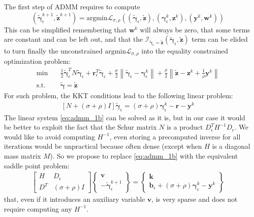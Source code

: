 \documentclass{svproc}
\newcommand{\vect}[1]{\bm{#1}}
\newcommand{\norm}[1]{\left\lVert#1\right\rVert}
\begin{document}
The first step of ADMM requires to compute 
\[
(\tilde{\vect{\gamma}}_\epsilon^{k+1},\tilde{\vect{z}}^{k+1}) = \text{argmin} \mathcal{L}_{\sigma,\rho} \left((\tilde{\vect{\gamma}}_\epsilon,\tilde{\vect{z}}),(\vect{\gamma}_\epsilon^k,\vect{z}^k),(\vect{y}^k,\vect{w}^k)\right)
\] 
This can be simplified remembering that $\vect{w}^k$ will always be zero, that some terms are constant and can be left out, and that the $\mathcal{I}_{\tilde{\vect{\gamma}}_\epsilon = \tilde{\vect{z}}}(\tilde{\vect{\gamma}}_\epsilon,\tilde{\vect{z}})$ term can be elided to turn finally the unconstrained $\text{argmin}\mathcal{L}_{\sigma,\rho}$ into the equality constrained optimization problem:
\begin{subequations}
	\begin{align}
    \text{min} \quad  &  \frac{1}{2} \tilde{\vect{\gamma}}_\epsilon^T N \tilde{\vect{\gamma}}_\epsilon + \vect{r}^T_\epsilon \tilde{\vect{\gamma}}_\epsilon  
+ \frac{\sigma}{2} \norm{\tilde{\vect{\gamma}}_\epsilon - \vect{\gamma}_\epsilon^k}
+ \frac{\rho}{2} \norm{\tilde{\vect{z}} - \vect{z}^k + \frac{1}{\rho} \vect{y}^k} \\
	  \text{s.t.} \quad &  \tilde{\vect{\gamma}} = \tilde{\vect{z}}
	\end{align}
	\label{eq:admm_1a}
\end{subequations}
%
For such problem, the KKT conditions lead to the following linear problem:
\begin{align}
    \left[ N + (\sigma+\rho) I \right] \tilde{\vect{\gamma}}_\epsilon = (\sigma+\rho) \vect{\gamma}_\epsilon^k - \vect{r} - \vect{y}^k
		\label{eq:admm_1b}
\end{align}
%
The linear system \eqref{eq:admm_1b} can be solved as it is, but in our case it would be better to exploit the fact that the Schur matrix $N$ is a product $D_\epsilon^T H^{-1} D_\epsilon$. We would like to avoid computing $H^{-1}$, even storing a precomputed inverse for all iterations would be unpractical because often dense (except when $H$ is a diagonal mass matrix $M$). So we propose to replace \eqref{eq:admm_1b} with the equivalent saddle point problem:
\begin{subequations}
	\begin{align}
    \begin{bmatrix}
		 H   & D_\epsilon \\
		 D^T & (\sigma+\rho) I
		\end{bmatrix}
		\begin{Bmatrix}
		 \vect{v}    \\
		 -\tilde{\vect{\gamma}}_\epsilon^{k+1} 
		\end{Bmatrix}
		=
		\begin{Bmatrix}
		 \vect{k} \\
		 \vect{b}_\epsilon + (\sigma+\rho) \vect{\gamma}_\epsilon^k-\vect{y}^k 
		\end{Bmatrix}
	\end{align}
	\label{eq:admm_1c}
\end{subequations}
that, even if it introduces an auxiliary variable $\vect{v}$, is very sparse and does not require computing any $H^{-1}$.
\end{document}
